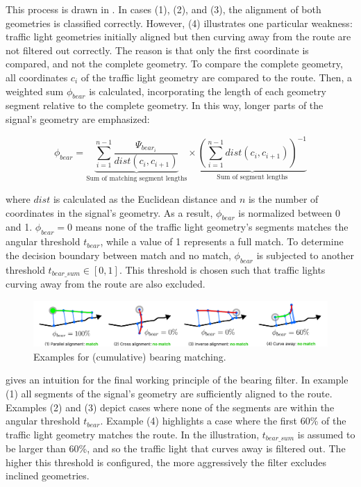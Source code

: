 This process is drawn in . In cases (1), (2), and (3), the alignment of both geometries is classified correctly. However, (4) illustrates one particular weakness: traffic light geometries initially aligned but then curving away from the route are not filtered out correctly. The reason is that only the first coordinate is compared, and not the complete geometry. To compare the complete geometry, all coordinates $c_i$ of the traffic light geometry are compared to the route. Then, a weighted sum $\phi_{bear}$ is calculated, incorporating the length of each geometry segment relative to the complete geometry. In this way, longer parts of the signal's geometry are emphasized:


\begin{equation} 
\phi_{bear} = 
    \underbrace{\sum_{i=1}^{n-1} 
    \frac{\Psi_{bear_i}}{dist(c_i, c_{i+1})}}_{\text{Sum of matching segment lengths}}
    \times
    \underbrace{(\sum_{i=1}^{n-1} dist(c_i, c_{i+1}))^{-1}}_{\text{Sum of segment lengths}}
\end{equation}

where $dist$ is calculated as the Euclidean distance and $n$ is the number of coordinates in the signal's geometry. As a result, $\phi_{bear}$ is normalized between 0 and 1. $\phi_{bear} = 0$ means none of the traffic light geometry's segments matches the angular threshold $t_{bear}$, while a value of 1 represents a full match. To determine the decision boundary between match and no match, $\phi_{bear}$ is subjected to another threshold $t_{bear\_sum} \in [0, 1]$. This threshold is chosen such that traffic lights curving away from the route are also excluded.

\begin{figure}[htbp]
\centering
\includegraphics[width=\linewidth]{images/sg-selection-bearing-filter-sum.pdf}
\caption{Examples for (cumulative) bearing matching.}
\label{fig:sg-selection-bearing-filter-sum}
\end{figure}

 gives an intuition for the final working principle of the bearing filter. In example (1) all segments of the signal's geometry are sufficiently aligned to the route. Examples (2) and (3) depict cases where none of the segments are within the angular threshold $t_{bear}$. Example (4) highlights a case where the first 60\% of the traffic light geometry matches the route. In the illustration, $t_{bear\_sum}$ is assumed to be larger than 60\%, and so the traffic light that curves away is filtered out. The higher this threshold is configured, the more aggressively the filter excludes inclined geometries.

